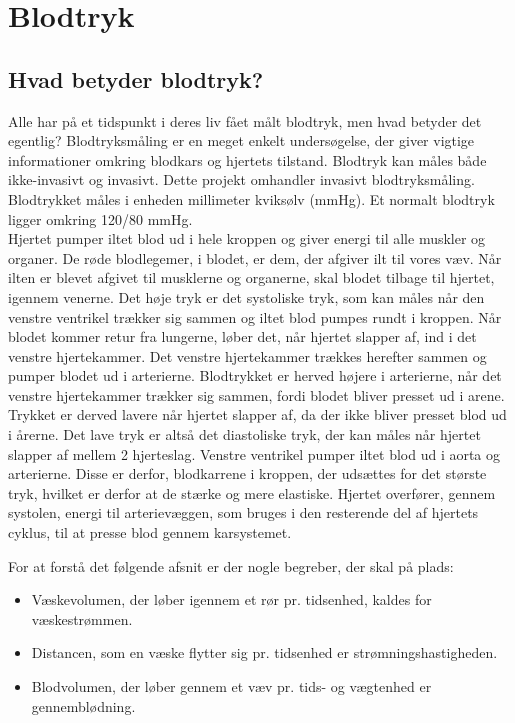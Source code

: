 \chapter{Blodtryk}
\section{Hvad betyder blodtryk?} 
Alle har på et tidspunkt i deres liv fået målt blodtryk, men hvad betyder det egentlig?
Blodtryksmåling er en meget enkelt undersøgelse, der giver vigtige informationer omkring blodkars og hjertets tilstand. Blodtryk kan måles både ikke-invasivt og invasivt. Dette projekt omhandler invasivt blodtryksmåling. 
Blodtrykket måles i enheden millimeter kviksølv (mmHg). Et normalt blodtryk ligger omkring 120/80 mmHg. \\ 
Hjertet pumper iltet blod ud i hele kroppen og giver energi til alle muskler og organer. De røde blodlegemer, i blodet, er dem, der afgiver ilt til vores væv. Når ilten er blevet afgivet til musklerne og organerne, skal blodet tilbage til hjertet, igennem venerne.  
Det høje tryk er det systoliske tryk, som kan måles når den venstre ventrikel trækker sig sammen og iltet blod pumpes rundt i kroppen. 
Når blodet kommer retur fra lungerne, løber det, når hjertet slapper af, ind i det venstre hjertekammer. Det venstre hjertekammer trækkes herefter sammen og pumper blodet ud i arterierne. Blodtrykket er herved højere i arterierne, når det venstre hjertekammer trækker sig sammen, fordi blodet bliver presset ud i arene. Trykket er derved lavere når hjertet slapper af, da der ikke bliver presset blod ud i årerne. 
Det lave tryk er altså det diastoliske tryk, der kan måles når hjertet slapper af mellem 2 hjerteslag. 
Venstre ventrikel pumper iltet blod ud i aorta og arterierne. Disse er derfor, blodkarrene i kroppen, der udsættes for det største tryk, hvilket er derfor at de stærke og mere elastiske. 
Hjertet overfører, gennem systolen, energi til arterievæggen, som bruges i den resterende del af hjertets cyklus, til at presse blod gennem karsystemet. 

For at forstå det følgende afsnit er der nogle begreber, der skal på plads: 
\begin{itemize}
\item Væskevolumen, der løber igennem et rør pr. tidsenhed, kaldes for væskestrømmen.
\item Distancen, som en væske flytter sig pr. tidsenhed er strømningshastigheden.
\item Blodvolumen, der løber gennem et væv pr. tids- og vægtenhed er gennemblødning.
\end{itemize}

